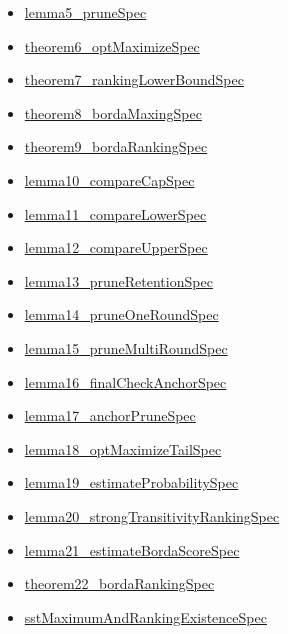 \documentclass[10pt]{article}
\begin{document}
\begin{itemize}[leftmargin=1.2em]
\begin{itemize}[leftmargin=1.2em]
\item \hyperlink{source-claim-4c6c294211fead99}{lemma5\_\allowbreak{}prune\allowbreak{}Spec}
\item \hyperlink{source-claim-af58d1ab93bf14de}{theorem6\_\allowbreak{}opt\allowbreak{}Maximize\allowbreak{}Spec}
\item \hyperlink{source-claim-eddfb104f13a8567}{theorem7\_\allowbreak{}ranking\allowbreak{}Lower\allowbreak{}Bound\allowbreak{}Spec}
\item \hyperlink{source-claim-36b59fc8901b02b0}{theorem8\_\allowbreak{}borda\allowbreak{}Maxing\allowbreak{}Spec}
\item \hyperlink{source-claim-3e26f4efead96be8}{theorem9\_\allowbreak{}borda\allowbreak{}Ranking\allowbreak{}Spec}
\item \hyperlink{source-claim-c39da77fbfc7426b}{lemma10\_\allowbreak{}compare\allowbreak{}Cap\allowbreak{}Spec}
\item \hyperlink{source-claim-07ac7de89ff9cdc5}{lemma11\_\allowbreak{}compare\allowbreak{}Lower\allowbreak{}Spec}
\item \hyperlink{source-claim-b0ceb08b87d5f5f7}{lemma12\_\allowbreak{}compare\allowbreak{}Upper\allowbreak{}Spec}
\item \hyperlink{source-claim-fd70b9f9c339b2ba}{lemma13\_\allowbreak{}prune\allowbreak{}Retention\allowbreak{}Spec}
\item \hyperlink{source-claim-0539092a1e145803}{lemma14\_\allowbreak{}prune\allowbreak{}One\allowbreak{}Round\allowbreak{}Spec}
\item \hyperlink{source-claim-c9bda0a70ac78048}{lemma15\_\allowbreak{}prune\allowbreak{}Multi\allowbreak{}Round\allowbreak{}Spec}
\item \hyperlink{source-claim-ad663f8615f67281}{lemma16\_\allowbreak{}final\allowbreak{}Check\allowbreak{}Anchor\allowbreak{}Spec}
\item \hyperlink{source-claim-287c18ae7ed3fbe0}{lemma17\_\allowbreak{}anchor\allowbreak{}Prune\allowbreak{}Spec}
\item \hyperlink{source-claim-34b819d901bf2ac4}{lemma18\_\allowbreak{}opt\allowbreak{}Maximize\allowbreak{}Tail\allowbreak{}Spec}
\item \hyperlink{source-claim-f54715f4dcb4708a}{lemma19\_\allowbreak{}estimate\allowbreak{}Probability\allowbreak{}Spec}
\item \hyperlink{source-claim-840a61f4766c5bed}{lemma20\_\allowbreak{}strong\allowbreak{}Transitivity\allowbreak{}Ranking\allowbreak{}Spec}
\item \hyperlink{source-claim-40bce86938f6a991}{lemma21\_\allowbreak{}estimate\allowbreak{}Borda\allowbreak{}Score\allowbreak{}Spec}
\item \hyperlink{source-claim-2bb1c4a4cf5c6775}{theorem22\_\allowbreak{}borda\allowbreak{}Ranking\allowbreak{}Spec}
\item \hyperlink{source-claim-948aca3b2ce42007}{sst\allowbreak{}Maximum\allowbreak{}And\allowbreak{}Ranking\allowbreak{}Existence\allowbreak{}Spec}
\end{itemize}
\end{itemize}
\end{document}

